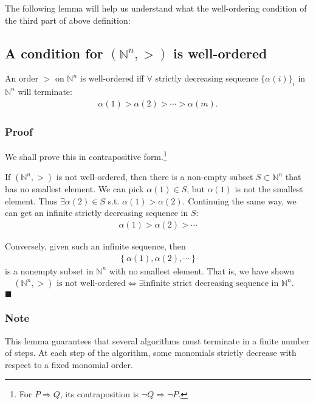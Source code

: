 \documentclass[11pt]{book}
\begin{document}
The following lemma will help us understand what the well-ordering condition of the third part of above definition:

\subsection{A condition for $(\mathbb{N}^n, >)$ is well-ordered}
\label{wellOrderingCondition}
An order $>$ on $\mathbb{N}^n$ is well-ordered iff $\forall$ strictly decreasing sequence $\{\alpha(i)\}_i$ in $\mathbb{N}^n$ will terminate:
\begin{eqnarray}
\alpha(1) > \alpha(2) > \cdots > \alpha(m).
\end{eqnarray}

\subsubsection{Proof}
We shall prove this in contrapositive form.\footnote{For $P\Rightarrow Q$, its contraposition is $\lnot Q \Rightarrow \lnot P$.}

If $(\mathbb{N}^n, >)$ is not well-ordered, then there is a non-empty subset $S \subset \mathbb{N}^n$ that has no smallest element.
We can pick $\alpha(1) \in S$, but $\alpha(1)$ is not the smallest element.
Thus $\exists \alpha(2) \in S$ s.t. $\alpha(1) > \alpha(2)$.
Continuing the same way, we can get an infinite strictly decreasing sequence in $S$:
\begin{eqnarray}
\alpha(1) > \alpha(2) > \cdots
\end{eqnarray}

Conversely, given such an infinite sequence, then
\begin{eqnarray}
\left\{\alpha(1), \alpha(2), \cdots \right\}
\end{eqnarray}
is a nonempty subset in $\mathbb{N}^n$ with no smallest element.
That is, we have shown
\begin{eqnarray}
(\mathbb{N}^n, >) \text{ is not well-ordered} \Leftrightarrow \exists \text{infinite strict decreasing sequence in } \mathbb{N}^n. \quad
\end{eqnarray}
$\blacksquare$

\subsubsection{Note}
This lemma guarantees that several algorithms must terminate in a finite number of steps.
At each step of the algorithm, some monomials strictly decrease with respect to a fixed monomial order.
\end{document}
